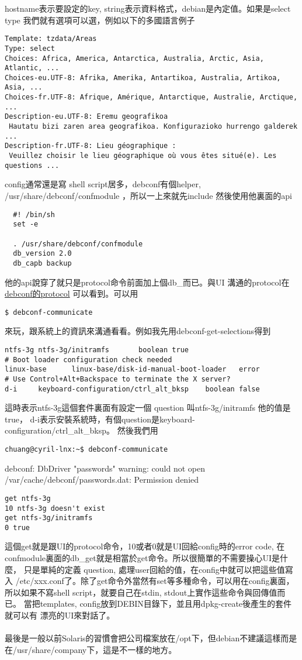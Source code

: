   hostname表示要設定的key, string表示資料格式，debian是內定值。如果是select type
  我們就有選項可以選，例如以下的多國語言例子
  \begin{verbatim}
Template: tzdata/Areas
Type: select
Choices: Africa, America, Antarctica, Australia, Arctic, Asia, Atlantic, ...
Choices-eu.UTF-8: Afrika, Amerika, Antartikoa, Australia, Artikoa, Asia, ...
Choices-fr.UTF-8: Afrique, Amérique, Antarctique, Australie, Arctique, ...
Description-eu.UTF-8: Eremu geografikoa
 Hautatu bizi zaren area geografikoa. Konfigurazioko hurrengo galderek ...
Description-fr.UTF-8: Lieu géographique :
 Veuillez choisir le lieu géographique où vous êtes situé(e). Les questions ...
  \end{verbatim}
  config通常還是寫 shell script居多，debconf有個helper, 
  /usr/share/debconf/confmodule ，所以一上來就先include 然後使用他裏面的api
  \begin{verbatim}
  #! /bin/sh
  set -e

  . /usr/share/debconf/confmodule
  db_version 2.0
  db_capb backup
  \end{verbatim}
  他的api說穿了就只是protocol命令前面加上個db\_而已。與UI 溝通的protocol在
  \href{https://www.debian.org/doc/packaging-manuals/debconf\_specification.html#AEN106}{debconf的protocol}
  可以看到。可以用
  \begin{verbatim}
$ debconf-communicate
  \end{verbatim}
  來玩，跟系統上的資訊來溝通看看。例如我先用debconf-get-selections得到
  \begin{verbatim}
ntfs-3g ntfs-3g/initramfs       boolean true
# Boot loader configuration check needed
linux-base      linux-base/disk-id-manual-boot-loader   error   
# Use Control+Alt+Backspace to terminate the X server?
d-i     keyboard-configuration/ctrl_alt_bksp    boolean false
  \end{verbatim}
  這時表示ntfs-3g這個套件裏面有設定一個 question 叫ntfs-3g/initramfs 他的值是true，
  d-i表示安裝系統時，有個question是keyboard-configuration/ctrl\_alt\_bksp。
  然後我們用
  \begin{verbatim}
chuang@cyril-lnx:~$ debconf-communicate 
  \end{verbatim}
  \parbox{\textwidth}{debconf: DbDriver "passwords" warning: could not open /var/cache/debconf/passwords.dat: Permission denied}
  \begin{verbatim}
get ntfs-3g
10 ntfs-3g doesn't exist
get ntfs-3g/initramfs
0 true
  \end{verbatim}
  這個get就是跟UI的protocol命令，10或者0就是UI回給config時的error code, 在
  confmodule裏面的db\_get就是相當於get命令。所以很簡單的不需要操心UI是什麼，
  只是單純的定義 question, 處理user回給的值，在config中就可以把這些值寫入
  /etc/xxx.conf了。除了get命令外當然有set等多種命令，可以用在config裏面，
  所以如果不寫shell script，就要自己在stdin, stdout上實作這些命令與回傳值而已。
  當把templates, config放到DEBIN目錄下，並且用dpkg-create後產生的套件就可以有
  漂亮的UI來對話了。
  \\\\
  最後是一般以前Solaris的習慣會把公司檔案放在/opt下，但debian不建議這樣而是
  在/usr/share/company下，這是不一樣的地方。


